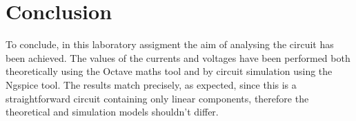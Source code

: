 \section{Conclusion}
\label{sec:conclusion}

To conclude, in this laboratory assigment the aim of analysing the circuit has been achieved. The values of the currents and voltages have been performed both theoretically using the Octave maths tool and by circuit simulation using the Ngspice tool. The results match precisely, as expected, since this is a straightforward circuit containing only linear components, therefore the theoretical and simulation models shouldn't differ. 